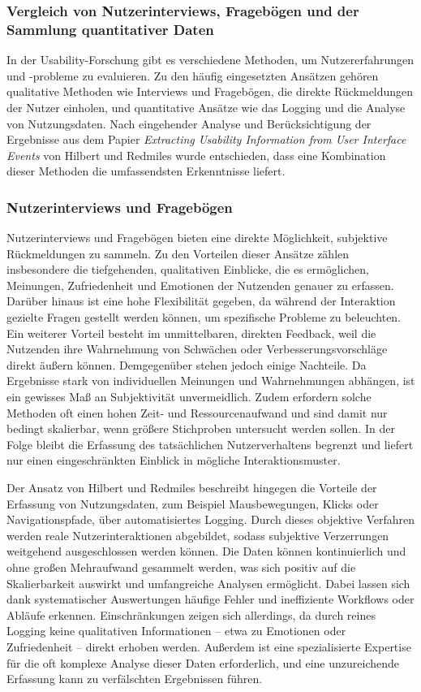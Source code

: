 \documentclass[12pt,oneside]{article}
\begin{document}
\subsubsection{Vergleich von Nutzerinterviews, Fragebögen und der Sammlung quantitativer Daten}

In der Usability-Forschung gibt es verschiedene Methoden, um Nutzererfahrungen und -probleme zu evaluieren. Zu den häufig eingesetzten Ansätzen gehören qualitative Methoden wie Interviews und Fragebögen, die direkte Rückmeldungen der Nutzer einholen, und quantitative Ansätze wie das Logging und die Analyse von Nutzungsdaten. Nach eingehender Analyse und Berücksichtigung der Ergebnisse aus dem Papier \textit{Extracting Usability Information from User Interface Events} von Hilbert und Redmiles \cite{Hilbert2000} wurde entschieden, dass eine Kombination dieser Methoden die umfassendsten Erkenntnisse liefert.
\subsubsection{Nutzerinterviews und Fragebögen}
Nutzerinterviews und Fragebögen bieten eine direkte Möglichkeit, subjektive Rückmeldungen zu sammeln. Zu den Vorteilen dieser Ansätze zählen insbesondere die tiefgehenden, qualitativen Einblicke, die es ermöglichen, Meinungen, Zufriedenheit und Emotionen der Nutzenden genauer zu erfassen. Darüber hinaus ist eine hohe Flexibilität gegeben, da während der Interaktion gezielte Fragen gestellt werden können, um spezifische Probleme zu beleuchten. Ein weiterer Vorteil besteht im unmittelbaren, direkten Feedback, weil die Nutzenden ihre Wahrnehmung von Schwächen oder Verbesserungsvorschläge direkt äußern können. Demgegenüber stehen jedoch einige Nachteile. Da Ergebnisse stark von individuellen Meinungen und Wahrnehmungen abhängen, ist ein gewisses Maß an Subjektivität unvermeidlich. Zudem erfordern solche Methoden oft einen hohen Zeit- und Ressourcenaufwand und sind damit nur bedingt skalierbar, wenn größere Stichproben untersucht werden sollen. In der Folge bleibt die Erfassung des tatsächlichen Nutzerverhaltens begrenzt und liefert nur einen eingeschränkten Einblick in mögliche Interaktionsmuster.

Der Ansatz von Hilbert und Redmiles \cite{Hilbert2000} beschreibt hingegen die Vorteile der Erfassung von Nutzungsdaten, zum Beispiel Mausbewegungen, Klicks oder Navigationspfade, über automatisiertes Logging. Durch dieses objektive Verfahren werden reale Nutzerinteraktionen abgebildet, sodass subjektive Verzerrungen weitgehend ausgeschlossen werden können. Die Daten können kontinuierlich und ohne großen Mehraufwand gesammelt werden, was sich positiv auf die Skalierbarkeit auswirkt und umfangreiche Analysen ermöglicht. Dabei lassen sich dank systematischer Auswertungen häufige Fehler und ineffiziente Workflows oder Abläufe erkennen. Einschränkungen zeigen sich allerdings, da durch reines Logging keine qualitativen Informationen – etwa zu Emotionen oder Zufriedenheit – direkt erhoben werden. Außerdem ist eine spezialisierte Expertise für die oft komplexe Analyse dieser Daten erforderlich, und eine unzureichende Erfassung kann zu verfälschten Ergebnissen führen.
\end{document}
